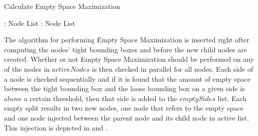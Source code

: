 \begin{algorithm}
  \caption{Calculate Empty Space Maximization}
  \label{alg:emptySpaceMaximizing}
  \begin{algorithmic}
               { : Node List}
               { : Node List}{


                 \STATE{}
                     \ENDIF
                   \ENDFOR
                 \ENDFOR
                 \ENDFOR
                 \ENDIF

                 \STATE{}

  }
  \end{algorithmic}
\end{algorithm}


The algorithm for performing Empty Space Maximization is inserted right after
computing the nodes' tight bounding boxes and before the new child nodes are
created. Whether or not Empty Space Maximization should be performed on any of
the nodes in $activeNodes$ is then checked in parallel for all nodes. Each side
of a node is checked sequentially and if it is found that the amount of empty
space between the tight bounding box and the loose bounding box on a given side
is above a certain threshold, then that side is added to the $emptySides$
list. Each empty split results in two new nodes, one node that refers to the
empty space and one node injected between the parent node and its child node in
active list. This injection is depicted in  and
.

